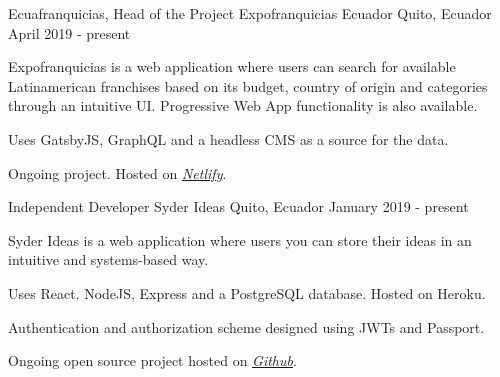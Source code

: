 \begin{cventries}
  \cventry
    {Ecuafranquicias, Head of the Project}
    {Expofranquicias Ecuador}
    {Quito, Ecuador}
    {April 2019 - present}
    {
      \begin{cvitems}
        \item {Expofranquicias is a web application where users can search for available Latinamerican franchises based on its budget, country of origin and categories through an intuitive UI. Progressive Web App functionality is also available.}
        \item {Uses GatsbyJS, GraphQL and a headless CMS as a source for the data. }
        \item {Ongoing project. Hosted on \href{https://expofranquiciasecuador.com/franquicias-disponibles}{\textit{Netlify}}.}
      \end{cvitems}
    }

  \cventry
    {Independent Developer}
    {Syder Ideas}
    {Quito, Ecuador}
    {January 2019 - present}
    {
      \begin{cvitems}
        \item {Syder Ideas is a web application where users you can store their ideas in an intuitive and systems-based way.}
        \item {Uses React. NodeJS, Express and a PostgreSQL database. Hosted on Heroku.}
        \item {Authentication and authorization scheme designed using JWTs and Passport.}
        \item {Ongoing open source project hosted on \href{https://github.com/guidosantillan01/syder-ideas}{\textit{Github}}.}
      \end{cvitems}
    }
\end{cventries}
